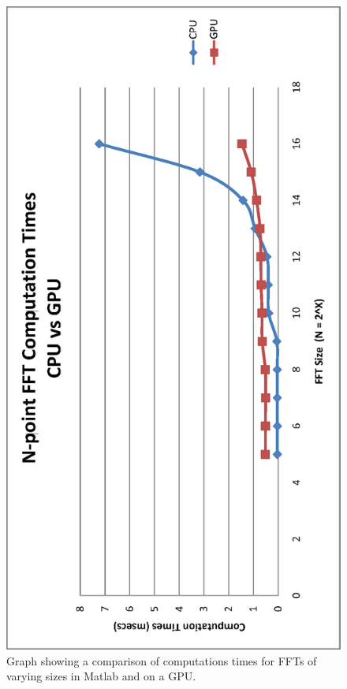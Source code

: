 \begin{figure}[ht]
\begin{center}
 \includegraphics[angle=270,scale=0.6]{images/gpu_images/matlab_vs_cuda_fft_timings.eps}
\end{center}
\caption{Graph showing a comparison of computations times for FFTs of varying sizes in Matlab and on a GPU.}
\label{fig:matlab_vs_gpu_fft_timings}
\end{figure}


